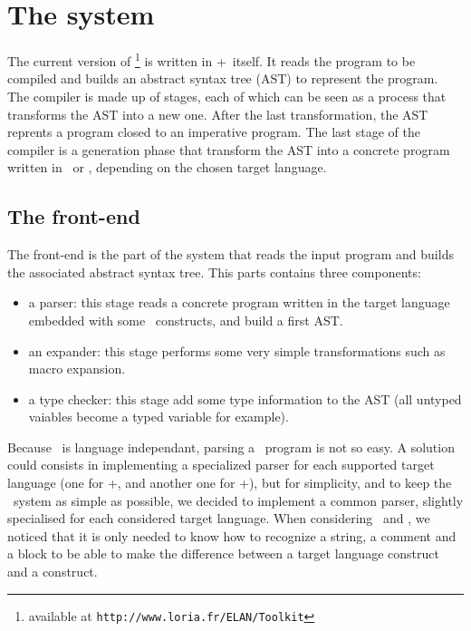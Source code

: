 \section{The system}

The current version of \TOM\footnote{available at
  \texttt{http://www.loria.fr/ELAN/Toolkit}} is written in
\Java+\TOM\ itself. 
It reads the program to be compiled and builds an abstract syntax tree
(AST) to represent the program.
The compiler is made up of stages, each of which can be seen as a
process that transforms the AST into a new one. After the last transformation,
the AST reprents a program closed to an imperative program.
The last stage of the compiler is a generation phase that transform
the AST into a concrete program written in \Clang\ or \Java, depending 
on the chosen target language.


\subsection{The front-end}
The front-end is the part of the system that reads the input program
and builds the associated abstract syntax tree.
This parts contains three components:
\begin{itemize}
\item a parser: this stage reads a concrete program written in the
  target language embedded with some \TOM\ constructs, and build a
  first AST.
\item an expander: this stage performs some very simple
  transformations such as macro expansion.
\item a type checker: this stage add some type information to the AST
  (all untyped vaiables become a typed variable for example).
\end{itemize}

Because \TOM\ is language independant, parsing a \TOM\ program is not
so easy. A solution could consists in implementing a specialized
parser for each supported target language (one for \Clang+\TOM, and
another one for \Java+\TOM), but for simplicity, and to keep the \TOM\
system as simple as possible, we decided to implement a common parser,
slightly specialised for each considered target language. 
When considering \Clang\ and \Java, we noticed that it is only needed to
know how to recognize a string, a comment and a block to be able to
make the difference between a target language construct and a \TOM
construct.

